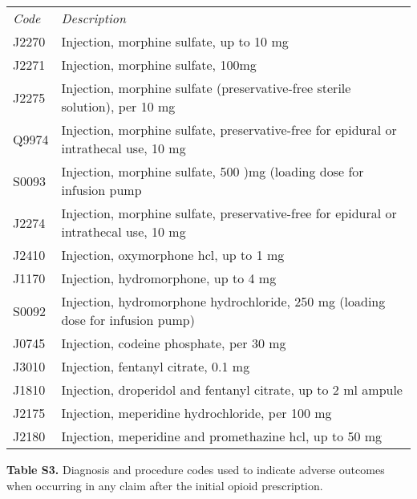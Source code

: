 \documentclass[10pt, letter]{article}
\begin{document}
\begin{tabular}{ll}
\em Code & \em Description \\[1em]
J2270 & Injection, morphine sulfate, up to 10 mg \\
J2271 & Injection, morphine sulfate, 100mg \\
J2275 & Injection, morphine sulfate (preservative-free sterile solution), per 10 mg \\
Q9974 & Injection, morphine sulfate, preservative-free for epidural or intrathecal use, 10 mg \\
S0093 & Injection, morphine sulfate, 500 )mg (loading dose for infusion pump \\
J2274 & Injection, morphine sulfate, preservative-free for epidural or intrathecal use, 10 mg \\
J2410 & Injection, oxymorphone hcl, up to 1 mg \\
J1170 & Injection, hydromorphone, up to 4 mg \\
S0092 & Injection, hydromorphone hydrochloride, 250 mg (loading dose for infusion pump) \\
J0745 & Injection, codeine phosphate, per 30 mg \\
J3010 & Injection, fentanyl citrate, 0.1 mg \\
J1810 & Injection, droperidol and fentanyl citrate, up to 2 ml ampule \\
J2175 & Injection, meperidine hydrochloride, per 100 mg \\
J2180 & Injection, meperidine and promethazine hcl, up to 50 mg
\end{tabular}

\newpage

\textbf{Table S3.} Diagnosis and procedure codes used to indicate adverse outcomes when occurring in any claim after the initial opioid prescription.
\end{document}
